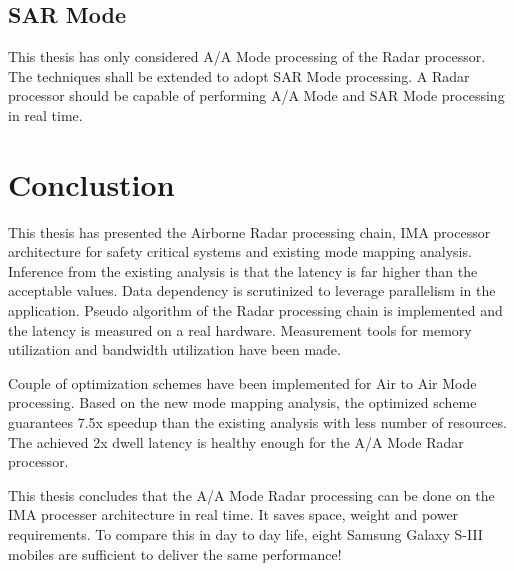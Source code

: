 \subsection{SAR Mode}
This thesis has only considered A/A Mode processing of the Radar processor. The techniques shall be extended to adopt SAR Mode processing. A Radar processor should be capable of performing A/A Mode and SAR Mode processing in real time.

\clearpage
\section{Conclustion}
\label{sec:ch5:conclustion}
This thesis has presented the Airborne Radar processing chain, IMA processor architecture for safety critical systems and existing mode mapping analysis. Inference from the existing analysis is that the latency is far higher than the acceptable values. Data dependency is scrutinized to leverage parallelism in the application. Pseudo algorithm of the Radar processing chain is implemented and the latency is measured on a real hardware. Measurement tools for memory utilization and bandwidth utilization have been made. \vspace*{0.2cm}

Couple of optimization schemes have been implemented for Air to Air Mode processing. Based on the new mode mapping analysis, the optimized scheme guarantees 7.5x speedup than the existing analysis with less number of resources. The achieved 2x dwell latency is healthy enough for the A/A Mode Radar processor. \vspace*{0.2cm}

This thesis concludes that the A/A Mode Radar processing can be done on the IMA processer architecture in real time. It saves space, weight and power requirements. To compare this in day to day life, eight Samsung Galaxy S-III mobiles are sufficient to deliver the same performance!


